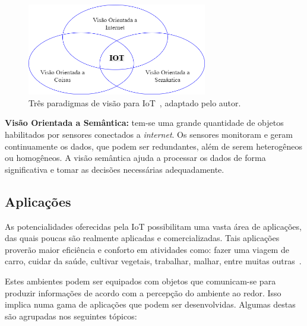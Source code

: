 \begin{figure}[ht]
\centering
\includegraphics[width=0.7\textwidth]{imagens/iot_vision.png}
\caption{Três paradigmas de visão para IoT~\cite{sankarinternet}, adaptado pelo autor.
\label{fig:iot_vision}}
\end{figure}
\FloatBarrier

\textbf{Visão Orientada a Semântica:} tem-se uma grande quantidade de objetos habilitados por sensores conectados a \textit{internet}. Os sensores monitoram e geram continuamente os dados, que podem ser redundantes, além de serem heterogêneos ou homogêneos. A visão semântica ajuda a processar os dados de forma significativa e tomar as decisões necessárias adequadamente.

\subsection{Aplicações}

As potencialidades oferecidas pela IoT possibilitam uma vasta área de aplicações, das quais poucas são realmente aplicadas e comercializadas. Tais aplicações proverão maior eficiência e conforto em atividades como: fazer uma viagem de carro, cuidar da saúde, cultivar vegetais, trabalhar, malhar, entre muitas outras~\cite{bandyopadhyay2011internet, atzori2010internet}.

Estes ambientes podem ser equipados com objetos que comunicam-se para produzir informações de acordo com a percepção do ambiente ao redor. Isso implica numa gama de aplicações que podem ser desenvolvidas. Algumas destas são agrupadas nos seguintes tópicos:

